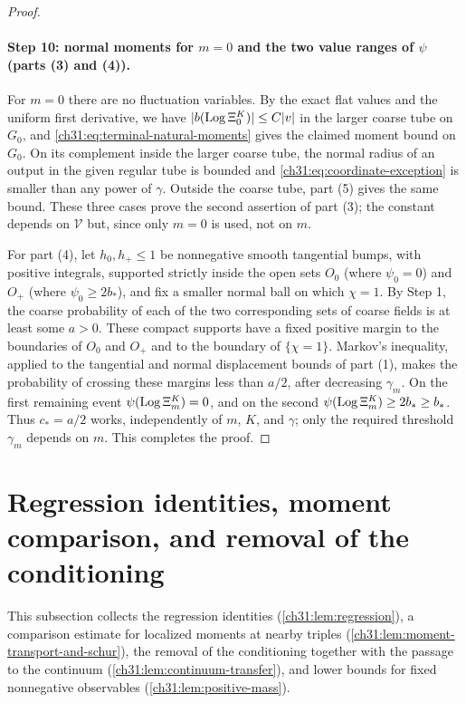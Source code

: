 \begin{proof}
\paragraph{Step 10: normal moments for $m=0$ and the two value ranges of $\psi$ (parts (3) and (4)).}
For $m=0$ there are no fluctuation variables. By the exact flat values and the uniform first derivative, we have $\lvert b(\operatorname{Log}\Xi_0^K)\rvert\le C\lvert v\rvert$ in the larger coarse tube on $G_0$, and \eqref{ch31:eq:terminal-natural-moments} gives the claimed moment bound on $G_0$. On its complement inside the larger coarse tube, the normal radius of an output in the given regular tube is bounded and \eqref{ch31:eq:coordinate-exception} is smaller than any power of $\gamma$. Outside the coarse tube, part (5) gives the same bound. These three cases prove the second assertion of part (3); the constant depends on $\mathcal V$ but, since only $m=0$ is used, not on $m$.

For part (4), let $h_0,h_+\le1$ be nonnegative smooth tangential bumps, with positive integrals, supported strictly inside the open sets $O_0$ (where $\psi_0=0$) and $O_+$ (where $\psi_0\ge2b_*$), and fix a smaller normal ball on which $\chi=1$. By Step 1, the coarse probability of each of the two corresponding sets of coarse fields is at least some $a>0$. These compact supports have a fixed positive margin to the boundaries of $O_0$ and $O_+$ and to the boundary of $\{\chi=1\}$. Markov's inequality, applied to the tangential and normal displacement bounds of part (1), makes the probability of crossing these margins less than $a/2$, after decreasing $\gamma_m$. On the first remaining event $\psi(\operatorname{Log}\Xi_m^K)=0$, and on the second $\psi(\operatorname{Log}\Xi_m^K)\ge2b_*\ge b_*$. Thus $c_*=a/2$ works, independently of $m$, $K$, and $\gamma$; only the required threshold $\gamma_m$ depends on $m$. This completes the proof.
\end{proof}

\section{Regression identities, moment comparison, and removal of the conditioning}\label{ch31:sec:transport}

This subsection collects the regression identities (\cref{ch31:lem:regression}), a comparison estimate for localized moments at nearby triples (\cref{ch31:lem:moment-transport-and-schur}), the removal of the conditioning together with the passage to the continuum (\cref{ch31:lem:continuum-transfer}), and lower bounds for fixed nonnegative observables (\cref{ch31:lem:positive-mass}).

